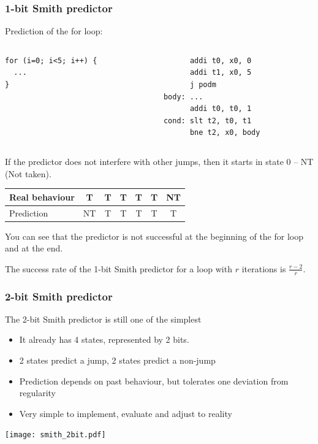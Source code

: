 \documentclass{beamer}
\begin{document}
\begin{frame}[fragile]
\frametitle{1-bit Smith predictor}

Prediction of the for loop:

\begin{columns}[T]
\begin{column}{0.35\textwidth}
\begin{verbatim}
for (i=0; i<5; i++) {
  ...
}
\end{verbatim}
\end{column}
\hfill
\begin{column}{0.45\textwidth}
\begin{verbatim}
      addi t0, x0, 0
      addi t1, x0, 5
      j podm
body: ...
      addi t0, t0, 1
cond: slt t2, t0, t1
      bne t2, x0, body
\end{verbatim}
\end{column}
\end{columns}
\bigskip
If the predictor does not interfere with other jumps, then it starts in state 0 -- NT (Not taken).

\begin{tabular}{|l|c|c|c|c|c|c|}\hline
Real behaviour & T & T & T & T & T & NT\\\hline
Prediction & {\color{red}NT} & T & T & T & T & {\color{red}T}\\\hline
\end{tabular}

You can see that the predictor is not successful at the beginning of the for loop and at the end.

The success rate of the 1-bit Smith predictor for a loop with $r$ iterations is $\frac{r-2}{r}$.
\end{frame}


\begin{frame}
\frametitle{2-bit Smith predictor}

The 2-bit Smith predictor is still one of the simplest
\begin{itemize}
\item It already has 4 states, represented by 2 bits.
\item 2 states predict a jump, 2 states predict a non-jump
\item Prediction depends on past behaviour, but tolerates one deviation from regularity
\item Very simple to implement, evaluate and adjust to reality
\end{itemize}

\begin{center}
\texttt{[image: smith\_2bit.pdf]}
\end{center}
\end{frame}
\end{document}
